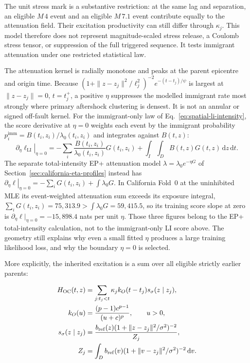 The unit stress mark is a substantive restriction: at the same lag and separation, an eligible $M\,4$ event and an eligible $M\,7.1$ event contribute equally to the attenuation field. Their excitation productivity can still differ through $\kappa_j$. This model therefore does not represent magnitude-scaled stress release, a Coulomb stress tensor, or suppression of the full triggered sequence. It tests immigrant attenuation under one restricted statistical law.

The attenuation kernel is radially monotone and peaks at the parent epicentre and origin time. Because $(1+\|z-z_j\|^2/\ell_j^2)^{-2}e^{-(t-t_j)/\psi}$ is largest at $\|z-z_j\|=0$, $t=t_j^+$, a positive $\eta$ suppresses the modelled immigrant rate most strongly where primary aftershock clustering is densest. It is not an annular or signed off-fault kernel. For the immigrant-only law of Eq.~\eqref{eq:spatial-li-intensity}, the score derivative at $\eta=0$ weights each event by the immigrant probability $p_i^{\mathrm{imm}}=B(t_i,z_i)/\lambda_0(t_i,z_i)$ and integrates against $B(t,z)$:
\[
\left.\partial_\eta \ell_{\mathrm{LI}}\right|_{\eta=0}
=-\sum_i \frac{B(t_i,z_i)}{\lambda_0(t_i,z_i)} G(t_i,z_i)
+\int_I \int_D B(t,z) G(t,z)\,\mathrm{d}z\,\mathrm{d}t .
\]
The separate total-intensity EP+ attenuation model $\lambda=\lambda_0e^{-\eta G}$ of Section~\ref{sec:california-eta-profiles} instead has $\left.\partial_\eta\ell\right|_{\eta=0}=-\sum_iG(t_i,z_i)+\int\lambda_0G$. In California Fold~0 at the uninhibited MLE its event-weighted attenuation sum exceeds its exposure integral, $\sum_iG(t_i,z_i)=75{,}313.9>\int\lambda_0G=59{,}415.5$, so its training score slope at zero is $\partial_\eta\ell|_{\eta=0}=-15{,}898.4$ nats per unit $\eta$. Those three figures belong to the EP+ total-intensity calculation, not to the immigrant-only LI score above. The geometry still explains why even a small fitted $\eta$ produces a large training likelihood loss, and why the boundary $\eta=0$ is selected.

More explicitly, the inherited excitation is a sum over all eligible strictly earlier parents:

\begin{align}
H_{\rm OC}(t,z)&=\sum_{j:t_j<t}\kappa_j k_O(t-t_j)s_\sigma(z\mid z_j),\\
k_O(u)&=\frac{(p-1)c^{p-1}}{(u+c)^p},\qquad u>0,\\
s_\sigma(z\mid z_j)&=\frac{b_{\rm ref}(z)(1+\lVert z-z_j\rVert^2/\sigma^2)^{-2}}{Z_j},\label{eq:spatial-normalized-density}\\
Z_j&=\int_D b_{\rm ref}(v)(1+\lVert v-z_j\rVert^2/\sigma^2)^{-2}\,\mathrm dv.
\end{align}

